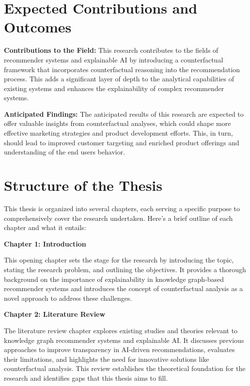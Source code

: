 \section{Expected Contributions and Outcomes}

\textbf{Contributions to the Field:} This research contributes to the fields of recommender
systems and explainable AI by introducing a counterfactual framework that incorporates
counterfactual reasoning into the recommendation process. This adds a
significant layer of depth to the analytical capabilities of existing systems
and enhances the explainability of complex recommender systems.

\textbf{Anticipated Findings:} The anticipated results of this research are expected to offer valuable insights
from counterfactual analyses, which could shape more effective marketing strategies
and product development efforts. This, in turn, should lead to improved customer
targeting and enriched product offerings and understanding of the end users behavior.

\section{Structure of the Thesis}


This thesis is organized into several chapters, each serving a specific purpose to
comprehensively cover the research undertaken. Here's a brief outline of each
chapter and what it entails:

\textbf{Chapter 1: Introduction}

This opening chapter sets the stage for the research by introducing the topic, stating
the research problem, and outlining the objectives. It provides a thorough background
on the importance of explainability in knowledge graph-based recommender systems
and introduces the concept of counterfactual analysis as a novel approach to address
these challenges.

\textbf{Chapter 2: Literature Review}

The literature review chapter explores existing studies and theories relevant
to knowledge graph recommender systems and explainable AI. It discusses previous
approaches to improve transparency in AI-driven recommendations, evaluates their
limitations, and highlights the need for innovative solutions like
counterfactual analysis. This review establishes the theoretical foundation for the
research and identifies gaps that this thesis aims to fill.

